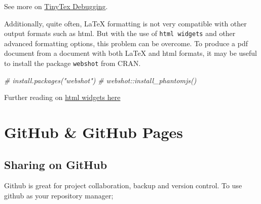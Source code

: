 \documentclass[
]{book}
\newenvironment{Shaded}{\begin{snugshade}}{\end{snugshade}}
\newcommand{\CommentTok}[1]{\textcolor[rgb]{0.56,0.35,0.01}{\textit{#1}}}
\begin{document}
See more on \href{https://yihui.org/tinytex/r/}{TinyTex Debugging}.

Additionally, quite often, LaTeX formatting is not very compatible with other output formats such as html. But with the use of \texttt{html\ widgets} and other advanced formatting options, this problem can be overcome.
To produce a pdf document from a document with both LaTeX and html formats, it may be useful to install the package \texttt{webshot} from CRAN.

\begin{Shaded}
\begin{Highlighting}[]
\CommentTok{\# install.packages("webshot")  }
\CommentTok{\# webshot::install\_phantomjs() }
\end{Highlighting}
\end{Shaded}

Further reading on \href{https://bookdown.org/yihui/bookdown/html-widgets.html}{html widgets here}

\hypertarget{github-github-pages}{%
\chapter{GitHub \& GitHub Pages}\label{github-github-pages}}

\hypertarget{sharing-on-github}{%
\section{Sharing on GitHub}\label{sharing-on-github}}

Github is great for project collaboration, backup and version control.
To use github as your repository manager;
\end{document}
